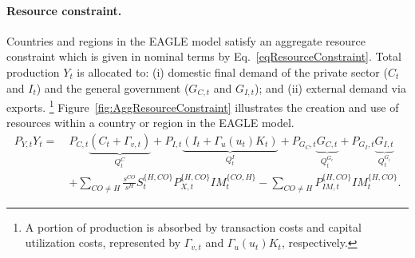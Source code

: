 \documentclass[a4paper,11pt]{article}
\numberwithin{equation}{section}
\begin{document}
\paragraph{Resource constraint.} Countries and regions in the EAGLE model satisfy an aggregate resource constraint which is given in nominal terms by Eq.~\ref{eqResourceConstraint}. Total production $Y_t$ is allocated to: (i) domestic final demand of the private sector ($C_t$ and $I_t$) and the general government ($G_{C,t}$ and $G_{I,t}$); and (ii) external demand via exports.
\footnote{
    A portion of production is absorbed by transaction costs and capital utilization costs, represented by $\Gamma_{v,t}$ and $\Gamma_u(u_t)K_t$, respectively.
} 
Figure~\ref{fig:AggResourceConstraint} illustrates the creation and use of resources within a country or region in the EAGLE model.
\begin{equation} \label{eqResourceConstraint}
    \begin{aligned}
        P_{Y,t} Y_t =\ & P_{C,t} \underbrace{\left(C_t + \Gamma_{v,t}\right)}_{Q_t^{C}} + P_{I,t} \underbrace{\left(I_t + \Gamma_u(u_t) K_t\right)}_{Q_t^{I}} + P_{G_C,t} \underbrace{G_{C,t}}_{Q_t^{G_c}} + P_{G_I,t} \underbrace{G_{I,t}}_{Q_t^{G_i}} \\
        & + \sum_{CO \neq H} \frac{s^{CO}}{s^H} S_t^{\{H,CO\}} P_{X,t}^{\{H,CO\}} IM_t^{\{CO,H\}} - \sum_{CO \neq H} P_{IM,t}^{\{H,CO\}} IM_t^{\{H,CO\}}.
    \end{aligned}
\end{equation}

\end{document}
